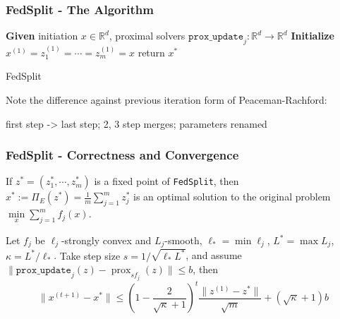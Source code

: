 \begin{frame}
\frametitle{FedSplit - The Algorithm}

{
\smaller
\begin{algorithm}[H]
\SetAlgoNoLine
\DontPrintSemicolon
{\bfseries Given} initiation $x\in\mathbb{R}^d$, proximal solvers $\texttt{prox\_update}_j: \mathbb{R}^d \to \mathbb{R}^d$ \;
{\bfseries Initialize} $x^{(1)} = z_1^{(1)} = \cdots = z_m^{(1)} = x$\;
return $x^*$\;
\caption{FedSplit}
\end{algorithm}
}

Note the difference against previous iteration form of Peaceman-Rachford:
\begin{center}
first step -> last step; 2, 3 step merges; parameters renamed
\end{center}

\end{frame}


\begin{frame}
\frametitle{FedSplit - Correctness and Convergence}

\begin{prop}[Correctness]
If $z^* = (z_1^*, \cdots, z_m^*)$ is a fixed point of \texttt{FedSplit}, then $x^* := \Pi_E(z^*) = \frac{1}{m} \sum_{j=1}^m z_j^*$ is an optimal solution to the original problem $\min\limits_{x} \sum_{j=1}^m f_j(x)$.
\end{prop}

\begin{thm}[Convergence]
Let $f_j$ be $\ell_j$-strongly convex and $L_j$-smooth, $\ell_* = \min \ell_j$, $L^* = \max L_j$, $\kappa = L^*/\ell_*$. {\color{red} Take step size $s = 1 / \sqrt{\ell_*L^*}$}, and assume $\lVert \texttt{prox\_update}_j(z) - \operatorname{prox}_{sf_j}(z) \rVert \leqslant b$, then
$$\lVert x^{(t+1)} - x^* \rVert \leqslant \left( 1 - \frac{2}{\sqrt{\kappa}+1} \right)^t \frac{\lVert z^{(1)} - z^* \rVert}{\sqrt{m}} + (\sqrt{\kappa}+1)b$$
\end{thm}

\end{frame}

